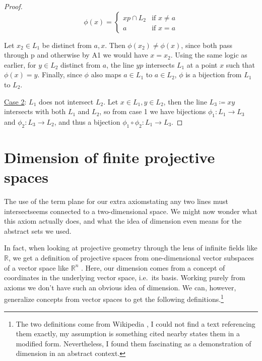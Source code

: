 \documentclass[12pt]{article}
\begin{document}
\begin{proof}
        \[
            \phi(x) =
            \begin{cases}
                xp \cap L_2 & \text{if } x \neq a \\
                a & \text{if } x = a
            \end{cases}
        \]

        Let $x_2\in L_1$ be distinct from $a, x$.
        Then $\phi(x_2) \neq \phi(x)$,
        since both pass through p and otherwise by A1 we would have $x = x_2$.
        Using the same logic as earlier, for $y \in L_2$ distinct from $a$, the line $yp$ intersects $L_1$ at a point $x$ such that $\phi(x)=y$.
        Finally, since $\phi$ also maps $a \in L_1$ to $a \in L_2$, $\phi$ is a bijection from $L_1$ to $L_2$.

        \underline{Case 2}: $L_1$ does not intersect $L_2$.
        Let $x \in L_1, y \in L_2$, then the line $L_3 \coloneqq xy$ intersects with both $L_1$ and $L_2$, so from case 1 we have bijections
        $\phi_1: L_1 \rightarrow L_3$ and $\phi_2: L_3 \rightarrow L_2$, and thus a bijection $\phi_1 \circ \phi_2: L_1 \rightarrow L_3$.
    \end{proof}


    \section{Dimension of finite projective spaces}

    The use of the term plane for our extra axiom\textemdash stating any two lines must intersect\textemdash seems connected to a two-dimensional space.
    We might now wonder what this axiom actually does, and what the idea of dimension even means for the abstract sets we used.

    In fact, when looking at projective geometry through the lens of infinite fields like $\mathbb{R}$,
    we get a definition of projective spaces from one-dimensional vector subspaces of a vector space like $\mathbb{R}^n$ \cite{weisstein_projective_nodate}.
    Here, our dimension comes from a concept of coordinates in the underlying vector space, i.e.\ its basis.
    Working purely from axioms we don't have such an obvious idea of dimension.
    We can, however, generalize concepts from vector spaces to get the following definitions.\footnote{
        The two definitions come from Wikipedia \cite{noauthor_projective_2024},
        I could not find a text referencing them exactly, my assumption is something cited nearby states them in a modified form.
        Nevertheless, I found them fascinating as a demonstration of dimension in an abstract context.
    }
\end{document}
